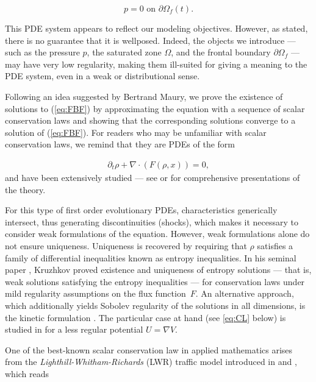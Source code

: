 \documentclass[11pt,twoside]{article}
\numberwithin{equation}{section}
\begin{document}
\begin{equation}
\label{eq:boundary}
p = 0 \text{ on } \partial \Omega_f(t).
\end{equation}


This PDE system appears to reflect our modeling objectives. However, as stated, there is no guarantee that it is wellposed. Indeed, the objects we introduce — such as the pressure \(p\), the saturated zone \(\Omega\), and the frontal boundary \(\partial \Omega_f\) — may have very low regularity, making them ill-suited for giving a meaning to the PDE system, even in a weak or distributional sense.

Following an idea suggested by Bertrand Maury, we prove the existence of solutions to (\ref{eq:FBF}) by approximating the equation with a sequence of scalar conservation laws and showing that the corresponding solutions converge to a solution of (\ref{eq:FBF}). For readers who may be unfamiliar with scalar conservation laws, we remind that they are PDEs of the form

\begin{align}
\label{eq:conservation_generic}
\partial_t \rho + \nabla \cdot (F(\rho,x)) = 0,
\end{align}
and have been extensively studied — see \cite{dafermos_constantine_m_hyperbolic_2016} or \cite{serre_systemes_1996} for comprehensive presentations of the theory.

For this type of first order evolutionary PDEs, characteristics generically intersect, thus generating discontinuities (shocks), which makes it necessary to consider weak formulations of the equation.
However, weak formulations alone do not ensure uniqueness. Uniqueness is recovered by requiring that $\rho$ satisfies a family of differential inequalities known as entropy inequalities. In his seminal paper \cite{kruzkov_first_1970}, Kruzhkov proved existence and uniqueness of entropy solutions — that is, weak solutions satisfying the entropy inequalities — for conservation laws under mild regularity assumptions on the flux function~$F$. An alternative approach, which additionally yields Sobolev regularity of the solutions in all dimensions, is the kinetic formulation \cite{MR2064166}. The particular case at hand (see \eqref{eq:CL} below) is studied in \cite{PeDa2009} for a less regular potential $U=\nabla V$.

One of the best-known scalar conservation law in applied mathematics arises from the \textit{Lighthill-Whitham-Richards} (LWR) traffic model introduced in \cite{lighthill_kinematic_1997} and \cite{richards_shock_1956}, which reads
\end{document}
